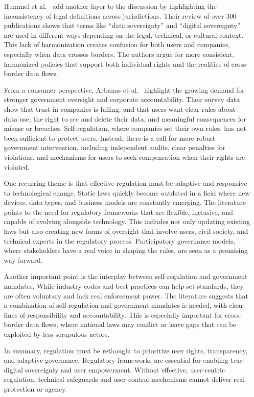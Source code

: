 	Hummel et al.~\cite{Hummel2021} add another layer to the discussion by highlighting the inconsistency of legal definitions across jurisdictions. Their review of over 300 publications shows that terms like “data sovereignty” and “digital sovereignty” are used in different ways depending on the legal, technical, or cultural context. This lack of harmonization creates confusion for both users and companies, especially when data crosses borders. The authors argue for more consistent, harmonized policies that support both individual rights and the realities of cross-border data flows.

	From a consumer perspective, Arbanas et al.~\cite{Arbanas2023} highlight the growing demand for stronger government oversight and corporate accountability. Their survey data show that trust in companies is falling, and that users want clear rules about data use, the right to see and delete their data, and meaningful consequences for misuse or breaches. Self-regulation, where companies set their own rules, has not been sufficient to protect users. Instead, there is a call for more robust government intervention, including independent audits, clear penalties for violations, and mechanisms for users to seek compensation when their rights are violated.

	One recurring theme is that effective regulation must be adaptive and responsive to technological change. Static laws quickly become outdated in a field where new devices, data types, and business models are constantly emerging. The literature points to the need for regulatory frameworks that are flexible, inclusive, and capable of evolving alongside technology. This includes not only updating existing laws but also creating new forms of oversight that involve users, civil society, and technical experts in the regulatory process. Participatory governance models, where stakeholders have a real voice in shaping the rules, are seen as a promising way forward.

	Another important point is the interplay between self-regulation and government mandates. While industry codes and best practices can help set standards, they are often voluntary and lack real enforcement power. The literature suggests that a combination of self-regulation and government mandates is needed, with clear lines of responsibility and accountability. This is especially important for cross-border data flows, where national laws may conflict or leave gaps that can be exploited by less scrupulous actors.

	In summary, regulation must be rethought to prioritize user rights, transparency, and adaptive governance. Regulatory frameworks are essential for enabling true digital sovereignty and user empowerment. Without effective, user-centric regulation, technical safeguards and user control mechanisms cannot deliver real protection or agency. 
